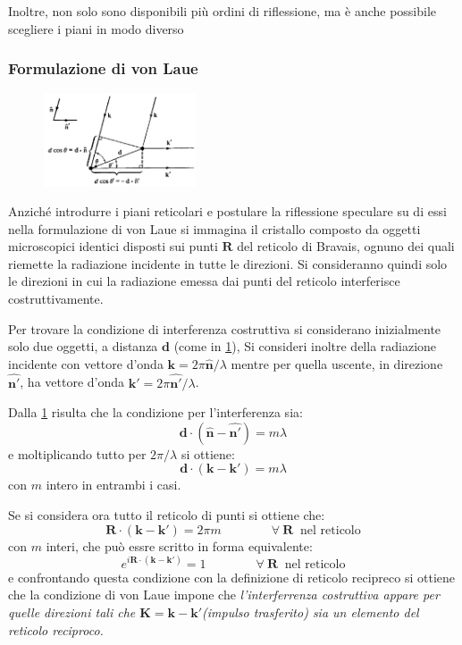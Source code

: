 Inoltre, non solo sono disponibili più ordini di riflessione, ma è anche possibile scegliere i piani in modo diverso

\subsubsection{Formulazione di von Laue}

\begin{figure}
	\vspace{-20pt}
	\centering
	\includegraphics[width=0.4\textwidth]{Immagini/vonLaueXRay.png}
	\caption{}
	\label{fig:laueX}
	\vspace{-10pt}
\end{figure}

Anziché introdurre i piani reticolari e postulare la riflessione speculare su di essi nella formulazione di von Laue si immagina il cristallo composto da oggetti microscopici identici disposti sui punti $ \textbf{R} $ del reticolo di Bravais, ognuno dei quali riemette la radiazione incidente in tutte le direzioni.
Si consideranno quindi solo le direzioni in cui la radiazione emessa dai punti del reticolo interferisce costruttivamente.

Per trovare la condizione di interferenza costruttiva si considerano inizialmente solo due oggetti, a distanza $ \textbf{d} $ (come in \cref{fig:laueX}), Si consideri inoltre della radiazione incidente con vettore d'onda $ \textbf{k} = 2\pi \hat{\textbf{n}}/\lambda $ mentre per quella uscente, in direzione $ \hat{\textbf{n}'} $, ha vettore d'onda $ \textbf{k}' = 2\pi\hat{\textbf{n}'}/\lambda $.

Dalla \cref{fig:laueX} risulta che la condizione per l'interferenza sia:
\[  \textbf{d}\cdot(\hat{\textbf{n}} - \hat{\textbf{n}'}) = m\lambda \]
e moltiplicando tutto per $ 2\pi/\lambda $ si ottiene:
\[  \textbf{d}\cdot(\textbf{k} - \textbf{k}') = m\lambda \]
con $ m $ intero in entrambi i casi.

Se si considera ora tutto il reticolo di punti si ottiene che:
\[ \textbf{R}\cdot(\textbf{k} - \textbf{k}') = 2\pi m \qquad \qquad \forall~\textbf{R}~\text{~nel reticolo}\]
con $ m $ interi, che può essre scritto in forma equivalente:
\[ e^{i \textbf{R}\cdot(\textbf{k} - \textbf{k}')} = 1 \qquad \qquad \forall~\textbf{R}~\text{~nel reticolo}  \]
e confrontando questa condizione con la definizione di reticolo recipreco si ottiene che la condizione di von Laue impone che \textit{l'interferrenza costruttiva appare per quelle direzioni tali che $ \textbf{K} = \textbf{k} - \textbf{k}' $(impulso trasferito) sia un elemento del reticolo reciproco.}

